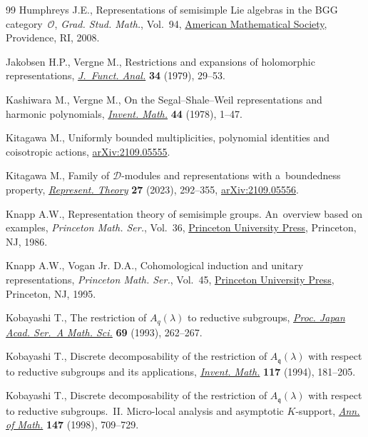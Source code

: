 \begin{thebibliography}{99}
Humphreys J.E., Representations of semisimple {L}ie algebras in the {BGG}
 category~{$\mathcal{O}$}, \textit{Grad. Stud. Math.}, Vol.~94,
 \href{https://doi.org/10.1090/gsm/094}{American Mathematical Society},
 Providence, RI, 2008.

Jakobsen H.P., Vergne M., Restrictions and expansions of holomorphic
 representations,
 \href{https://doi.org/10.1016/0022-1236(79)90023-5}{\textit{J.~Funct. Anal.}}
 \textbf{34} (1979), 29--53.

Kashiwara M., Vergne M., On the {S}egal--{S}hale--{W}eil representations and
 harmonic polynomials,
 \href{https://doi.org/10.1007/BF01389900}{\textit{Invent. Math.}} \textbf{44}
 (1978), 1--47.

Kitagawa M., Uniformly bounded multiplicities, polynomial identities and
 coisotropic actions,
 \href{http://arxiv.org/abs/2109.05555}{arXiv:2109.05555}.

Kitagawa M., Family of {$\mathcal{D}$}-modules and representations with
 a~boundedness property,
 \href{https://doi.org/10.1090/ert/641}{\textit{Represent. Theory}}
 \textbf{27} (2023), 292--355,
 \href{http://arxiv.org/abs/2109.05556}{arXiv:2109.05556}.

Knapp A.W., Representation theory of semisimple groups. An~overview based on
 examples, \textit{Princeton Math. Ser.}, Vol.~36,
 \href{https://doi.org/10.1515/9781400883974}{Princeton University Press},
 Princeton, NJ, 1986.

Knapp A.W., Vogan Jr. D.A., Cohomological induction and unitary
 representations, \textit{Princeton Math. Ser.}, Vol.~45,
 \href{https://doi.org/10.1515/9781400883936}{Princeton University Press},
 Princeton, NJ, 1995.

Kobayashi T., The restriction of {$A_q(\lambda)$} to reductive subgroups,
 \href{https://doi.org/10.3792/pjaa.69.262}{\textit{Proc. Japan Acad. Ser.~A
 Math. Sci.}} \textbf{69} (1993), 262--267.

Kobayashi T., Discrete decomposability of the restriction of
 {$A_{\mathfrak{q}}(\lambda)$} with respect to reductive subgroups and its
 applications, \href{https://doi.org/10.1007/BF01232239}{\textit{Invent.
 Math.}} \textbf{117} (1994), 181--205.

Kobayashi T., Discrete decomposability of the restriction of
 {$A_{\mathfrak{q}}(\lambda)$} with respect to reductive subgroups.~{II}.
 {M}icro-local analysis and asymptotic {$K$}-support,
 \href{https://doi.org/10.2307/120963}{\textit{Ann. of Math.}} \textbf{147}
 (1998), 709--729.


\end{thebibliography}
